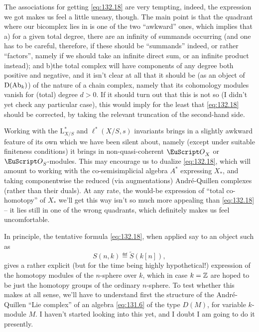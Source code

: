 The associations for getting \eqref{eq:132.18} are very tempting,
indeed, the expression we got makes us feel a little uneasy,
though. The main point is that the quadrant where our bicomplex lies
in is one of the two ``awkward'' ones, which implies that a)\enspace
for a given total degree, there are an infinity of summands occurring
(and one has to be careful, therefore, if these should be ``summands''
indeed, or rather ``factors'', namely if we should take an infinite
direct sum, or an infinite product instead); and b)\enspace the total
complex will have components of any degree both positive and negative,
and it isn't clear at all that it should be (as an object of
${\mathrm{D}}(\operatorname{Ab}_k)$) of the nature of a chain complex, namely that its
cohomology modules vanish for (total) degree $d>0$. If it should turn
out that this is not so (I didn't yet check any particular case), this
would imply for the least that \eqref{eq:132.18} should be corrected,
by taking the relevant truncation of the second-hand side.

Working with the $\mathrm L^*_{X/S}$ and $\ell^*(X/S,s)$ invariants
brings in a slightly awkward feature of its own which we have been
silent about, namely (except under suitable finiteness conditions) it
brings in non-quasi-coherent $\scrO_X$ or $\scrO_S$-modules. This may
encourage us to dualize \eqref{eq:132.18}, which will amount to
working with the co-semisimplicial algebra $A^*$ expressing $X_*$, and
taking componentwise the reduced (via augmentations) André-Quillen
complexes (rather than their duals). At any rate, the
would-be expression of ``total co-homotopy'' of $X_*$ we'll get this
way isn't so much more appealing than \eqref{eq:132.18} -- it lies
still in one of the wrong quadrants, which definitely makes us feel
uncomfortable.

In principle, the tentative formula \eqref{eq:132.18}, when applied
say to an object such as
\[S(n,k) \eqdef \widetilde S(k[n]),\]
gives a rather explicit (but for the time being highly hypothetical!)
expression of the homotopy modules of the $n$-sphere over $k$, which
in case $k={\mathbb{Z}}$ are hoped to be just the homotopy groups of the
ordinary $n$-sphere. To test whether this makes at all sense, we'll
have to understand first the structure of the André-Quillen ``Lie
complex'' of an algebra \eqref{eq:131.6} of the type $D(M)$, for
variable $k$-module $M$. I haven't started looking into this yet, and
I doubt I am going to do it presently.

